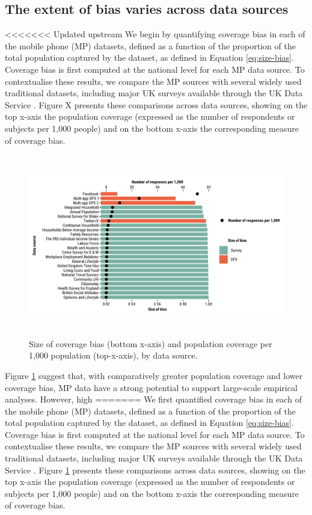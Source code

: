\documentclass[]{rsos}%
\begin{document}
\subsection{The extent of bias varies across data sources}\label{the-extent-of-bias-varies-across-data-sources}

<<<<<<< Updated upstream
We begin by quantifying coverage bias in each of the mobile phone (MP)
datasets, defined as a function of the proportion of the total
population captured by the dataset, as defined in Equation
\ref{eq:size-bias}. Coverage bias is first computed at the national
level for each MP data source. To contextualise these results, we
compare the MP sources with several widely used traditional datasets,
including major UK surveys available through the UK Data Service
\citep{ukdataserviceSurveysData}. Figure X presents these comparisons across
data sources, showing on the top x-axis the population coverage
(expressed as the number of respondents or subjects per 1,000 people)
and on the bottom x-axis the corresponding measure of coverage bias.

\begin{figure}
\centering
\includegraphics[width=5.20833in,height=3.125in]{figures/compare-surveys-legend.png}
\caption{Size of coverage bias (bottom x-axis) and population coverage per
1,000 population (top-x-axis), by data
source.}\label{fig:survey}
\end{figure}

Figure \ref{fig:survey} suggest that, with comparatively greater
population coverage and lower coverage bias, MP data have a strong
potential to support large-scale empirical analyses. However, high
=======
We first quantified coverage bias in each of the mobile phone (MP)
datasets,
defined as a function of the proportion of the total population captured
by the dataset, as defined in Equation \ref{eq:size-bias}.
Coverage bias is first computed at the national level for each MP data
source. To contextualise these results, we compare the MP sources with
several widely used traditional datasets, including major UK surveys
available through the UK Data Service \citep{ukdataserviceSurveysData}.
Figure \ref{fig:survey} presents these comparisons across data sources,
showing on the top x-axis the population coverage (expressed as the
number of respondents or subjects per 1,000 people) and on the bottom
x-axis the corresponding measure of coverage bias.
\end{document}
